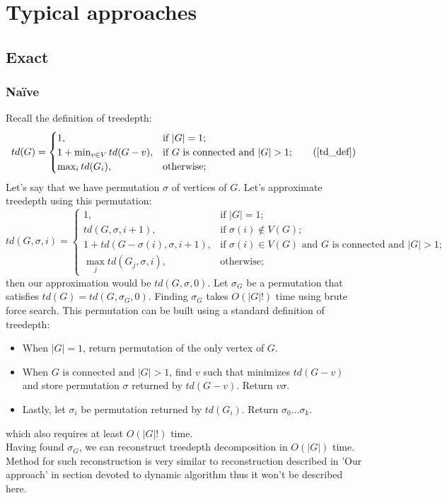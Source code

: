 \section{Typical approaches}
\subsection{Exact}
\subsubsection{Na\"ive}
Recall the definition of treedepth:
\begin{equation*}
td(G)={\begin{cases}1,&{\text{if }}|G|=1;\\1+\min _{{v\in V}}td(G-v),&{\text{if }}G{\text{ is connected and }}|G|>1;\\\max _{{i}}td(G_{i}),&{\text{otherwise}};\end{cases}}\tag{\ref{td_def}}
\end{equation*}
Let's say that we have permutation $\sigma$ of vertices of $G$. Let's approximate treedepth using this permutation:
\begin{equation}
td(G, \sigma, i)={
	\begin{cases}
	1,&{\text{if }}|G|=1;\\
	td(G, \sigma, i + 1), &{\text{if }}\sigma(i)\notin V(G);\\
	1+td(G-\sigma(i), \sigma, i+1),&{\text{if }}{\sigma(i)\in V(G)\text{ and }}G{\text{ is connected and }}|G|>1;\\
	\max _{{j}}td(G_{j}, \sigma, i),&{\text{otherwise}};
	\end{cases}
}
\label{td_def_paermutation}
\end{equation}
then our approximation would be $td(G, \sigma, 0)$. Let $\sigma_G$ be a permutation that satisfies $td(G) = td(G, \sigma_G, 0)$. Finding $\sigma_G$ takes $O\left(\left|G\right|!\right)$ time using brute force search. This permutation can be built using a standard definition of treedepth:
\begin{itemize}
	\item When $\left|G\right| = 1$, return permutation of the only vertex of $G$.
	\item When $G{\text{ is connected and }}|G|>1$, find $v$ such that minimizes $td(G-v)$ and store permutation $\sigma$ returned by $td(G-v)$. Return $v\sigma$.
	\item Lastly, let $\sigma_i$ be permutation returned by $td(G_i)$. Return $\sigma_0...\sigma_k$.
\end{itemize}
which also requires at least $O\left(\left|G\right|!\right)$ time.\\
Having found $\sigma_G$, we can reconstruct treedepth decomposition in $O\left(\left|G\right|\right)$ time. Method for such reconstruction is very similar to reconstruction described in 'Our approach' in section devoted to dynamic algorithm thus it won't be described here.
